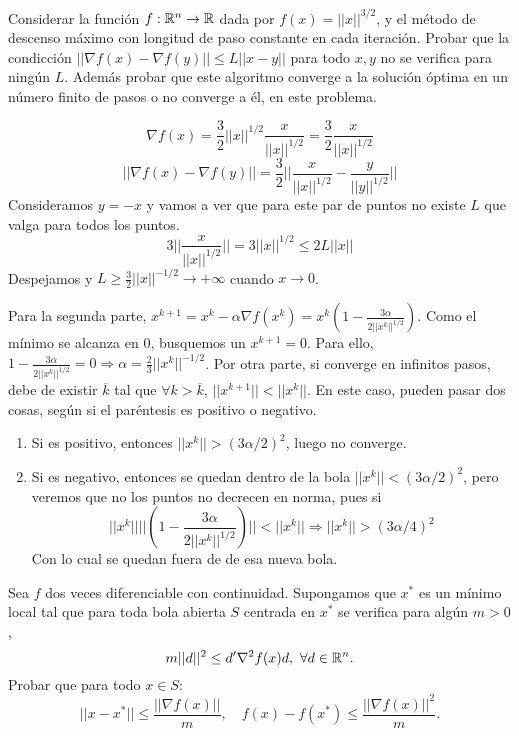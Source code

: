 \documentclass[twoside]{article}
\begin{document}
\begin{ejercicio}{7}
Considerar la función $f:\mathbb{R}^n\to\mathbb{R}$ dada por $f(x)=||x||^{3/2}$, y el método de descenso máximo con longitud de paso constante en cada iteración. Probar que la condicción $||\nabla f(x)-\nabla f(y)||\leq L||x-y||$ para todo $x,y$ no se verifica para ningún $L$. Además probar que este algoritmo converge a la solución óptima en un número finito de pasos o no converge a él, en este problema.
\end{ejercicio}
\begin{solucion}
$$\nabla f(x)=\frac{3}{2}||x||^{1/2}\frac{x}{||x||^{1/2}}=\frac{3}{2}\frac{x}{||x||^{1/2}}$$
$$||\nabla f(x)-\nabla f(y)||=\frac{3}{2}||\frac{x}{||x||^{1/2}}-\frac{y}{||y||^{1/2}}||$$
Consideramos $y=-x$ y vamos a ver que para este par de puntos no existe $L$ que valga para todos los puntos.
$$3||\frac{x}{||x||^{1/2}}||=3||x||^{1/2}\leq 2L||x||$$
Despejamos y $L\geq\frac{3}{2}||x||^{-1/2}\to +\infty$ cuando $x\to 0$.

Para la segunda parte, $x^{k+1}=x^k-\alpha\nabla f(x^k)=x^k\left(1-\frac{3\alpha}{2||x^k||^{1/2}}\right)$. Como el mínimo se alcanza en 0, busquemos un $x^{k+1}=0$. Para ello, $1-\frac{3\alpha}{2||x^k||^{1/2}}=0\Rightarrow \alpha=\frac{2}{3}||x^k||^{-1/2}$. 
Por otra parte, si converge en infinitos pasos, debe de existir $\overline{k}$ tal que $\forall k>\overline{k}$, $||x^{k+1}||<||x^k||$. En este caso, pueden pasar dos cosas, según si el paréntesis es positivo o negativo.
\begin{enumerate}
\item Si es positivo, entonces $||x^k||>(3\alpha/2)^2$, luego no converge. 
\item Si es negativo, entonces se quedan dentro de la bola $||x^k||<(3\alpha/2)^2$, pero veremos que no los puntos no decrecen en norma, pues si 
$$||x^k||||\left(1-\frac{3\alpha}{2||x^k||^{1/2}}\right)||<||x^k||\Rightarrow ||x^k||>(3\alpha/4)^2$$
Con lo cual se quedan fuera de de esa nueva bola.
\end{enumerate}
\end{solucion}

\newpage

\begin{ejercicio}{8}
Sea $f$ dos veces diferenciable con continuidad. Supongamos que $x^*$ es un mínimo local tal que para toda bola abierta $S$ centrada en $x^*$ se verifica para algún $m>0$,
$$m||d||^2\leq d'\nabla^2f(x)d,\ \forall d\in\mathbb{R}^n.$$
Probar que para todo $x\in S$:
$$||x-x^*||\leq\frac{||\nabla f(x)||}{m},\quad f(x)-f(x^*)\leq\frac{||\nabla f(x)||^2}{m}.$$
\end{ejercicio}
\begin{solucion}
\end{solucion}
\end{document}
